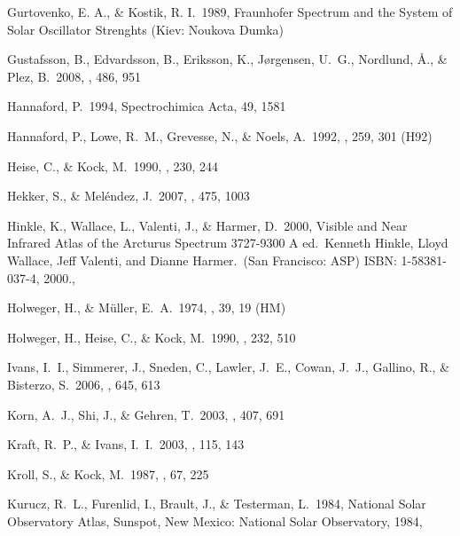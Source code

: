 \documentclass[traditabstract]{aa} %
\begin{document}
\begin{thebibliography}{}
Gurtovenko, E. A., \& Kostik, R. I.\ 1989, Fraunhofer Spectrum and the System of Solar Oscillator Strenghts (Kiev: Noukova Dumka) 

 Gustafsson, B., Edvardsson, B., Eriksson, K., J{\o}rgensen, U.~G., Nordlund, {\AA}., \& Plez, B.\ 2008, \aap, 486, 951 

 Hannaford, P.\ 1994, 
Spectrochimica Acta, 49, 1581 

 Hannaford, P., Lowe, R.~M., Grevesse, N., \& Noels, A.\ 1992, \aap, 259, 301 (H92)

 Heise, C., \& Kock, M.\ 1990, \aap, 230, 244 

 Hekker, S., \& Mel{\'e}ndez, J.\ 2007, \aap, 475, 1003 

 Hinkle, K., Wallace, L., 
Valenti, J., 
\& Harmer, D.\ 2000, Visible and Near Infrared Atlas of the Arcturus Spectrum 3727-9300 A ed.~Kenneth Hinkle, Lloyd Wallace, Jeff Valenti, and Dianne Harmer.~(San Francisco: ASP) ISBN: 1-58381-037-4, 2000.,  

 Holweger, H., \& M\"uller, E.~A.\ 1974, \solphys, 39, 19 (HM)

 Holweger, H., Heise, C., \& Kock, M.\ 1990, \aap, 232, 510 

 Ivans, I.~I., Simmerer, 
J., Sneden, C., Lawler, J.~E., Cowan, J.~J., Gallino, R., 
\& Bisterzo, S.\ 2006, \apj, 645, 613 

 Korn, A.~J., Shi, J., \& Gehren, T.\ 2003, \aap, 407, 691 

 Kraft, R.~P., \& Ivans, I.~I.\ 2003, \pasp, 115, 143 

 Kroll, S., \& Kock, M.\ 1987, \aaps, 67, 225 

 Kurucz, R.~L., Furenlid, 
I., Brault, J., 
\& Testerman, L.\ 1984, National Solar Observatory Atlas, Sunspot, New Mexico: National Solar Observatory, 1984,  


\end{thebibliography}
\end{document}
